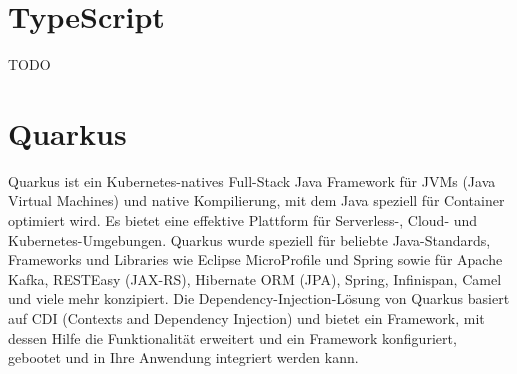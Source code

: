 \section{TypeScript}

TODO

\section{Quarkus}

Quarkus ist ein Kubernetes-natives Full-Stack Java Framework für JVMs (Java Virtual Machines) und native Kompilierung, mit dem Java speziell für Container optimiert wird. 
Es bietet eine effektive Plattform für Serverless-, Cloud- und Kubernetes-Umgebungen. Quarkus wurde speziell für beliebte Java-Standards, Frameworks und Libraries wie Eclipse MicroProfile und Spring
sowie für Apache Kafka, RESTEasy (JAX-RS), Hibernate ORM (JPA), Spring, Infinispan, Camel und viele mehr konzipiert.
Die Dependency-Injection-Lösung von Quarkus basiert auf CDI (Contexts and Dependency Injection) und bietet ein Framework, mit dessen Hilfe die Funktionalität 
erweitert und ein Framework konfiguriert, gebootet und in Ihre Anwendung integriert werden kann. 

